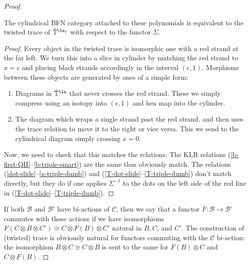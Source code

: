 \begin{proof}
\begin{proposition}
The cylindrical BFN category attached to these polynomials is equivalent to the twisted trace of $\tilde{\mathbb{T}}^{\la_1}$ with respect to the functor $\Sigma$.
\end{proposition}
\begin{proof}
Every object in the twisted trace is isomorphic one with a red strand
at the far left.  We turn this into a slice in cylinder by matching
the red strand to $x=\epsilon$ and placing
black strands accordingly in the interval $(\epsilon,1)$.  
Morphisms between these objects are generated by ones of a simple form:
\begin{enumerate}
    \item Diagrams
in $\tilde{\mathbb{T}}^{\la}$ that never crosses the red
strand.  These we simply compress using an isotopy into $(\epsilon,1)$ and hen map into the cylinder.
\item The diagram which wraps a single strand past the  red strand,
and then uses the trace relation to move it to the right or vice versa. This we send to the cylindrical diagram simply crossing $x=0$.
\end{enumerate}
Now, we need to check that this matches the relations.  The KLR relations (\ref{b-first-QH}--\ref{b-triple-smart}) are the same thus obviously match.  
 The relations
(\ref{dot-slide}--\ref{x-triple-dumb}) and (\ref{T-dot-slide}--\ref{T-triple-dumb}) don't match directly, but they do if one applies $\Sigma^{-1}$ to the dots on the left side of the red line in (\ref{T-dot-slide}--\ref{T-triple-dumb}).
\end{proof}


If both $\mathcal{B}$ and $\mathcal{B}'$ have bi-actions of $ \mathcal{C}$, then we say that a functor $F\colon \mathcal{B}\to \mathcal{B}'$ commutes with these actions if we have isomorphisms $F(C\otimes B\otimes C')\cong C\otimes F(B)\otimes C'$ natural in $B, C$, and $C'$.
The construction of (twisted) trace is obviously natural for functors commuting with the $\mathcal{C}$ bi-action: the isomorphism $B\otimes C\cong C\otimes B$ is sent to the same for $F(B)\otimes C$ and $C\otimes F(B)$.


\end{proof}
